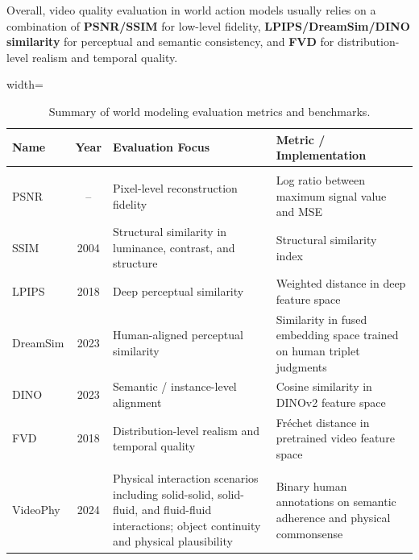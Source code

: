Overall, video quality evaluation in world action models usually relies on a combination of \textbf{PSNR/SSIM} for low-level fidelity, \textbf{LPIPS/DreamSim/DINO similarity} for perceptual and semantic consistency, and \textbf{FVD} for distribution-level realism and temporal quality.
\begin{table}[!h]
\centering
\scriptsize
\setlength{\tabcolsep}{4pt}
\renewcommand{\arraystretch}{1.15}
\caption{Summary of world modeling evaluation metrics and benchmarks.}
\label{tab:wam_eval_benchmarks}

\begin{adjustbox}{width=\textwidth}
\begin{threeparttable}
\begin{tabular}{
>{\RaggedRight\arraybackslash}p{2.6cm}
c
>{\RaggedRight\arraybackslash}p{5.2cm}
>{\RaggedRight\arraybackslash}p{4.4cm}
}
\toprule
\textbf{Name} & \textbf{Year} & \textbf{Evaluation Focus} & \textbf{Metric / Implementation} \\
\midrule

\rowcolor{gray!12}
\multicolumn{4}{l}{\textbf{Visual Fidelity}} \\
PSNR & -- & Pixel-level reconstruction fidelity & Log ratio between maximum signal value and MSE \\

SSIM \cite{ssim} & 2004 & Structural similarity in luminance, contrast, and structure & Structural similarity index \\

LPIPS \cite{lpips} & 2018 & Deep perceptual similarity & Weighted distance in deep feature space \\

DreamSim \cite{fu2023dreamsim} & 2023 & Human-aligned perceptual similarity & Similarity in fused embedding space trained on human triplet judgments \\

DINO \cite{oquab2023dinov2} & 2023 & Semantic / instance-level alignment & Cosine similarity in DINOv2 feature space \\

FVD \cite{unterthiner2018fvd} & 2018 & Distribution-level realism and temporal quality & Fr\'echet distance in pretrained video feature space \\

\midrule

\rowcolor{gray!12}
\multicolumn{4}{l}{\textbf{Object Dynamics}} \\
VideoPhy \cite{bansal2024videophy} & 2024 & Physical interaction scenarios including solid-solid, solid-fluid, and fluid-fluid interactions; object continuity and physical plausibility & Binary human annotations on semantic adherence and physical commonsense \\


\end{tabular}
\end{threeparttable}
\end{adjustbox}
\end{table}
